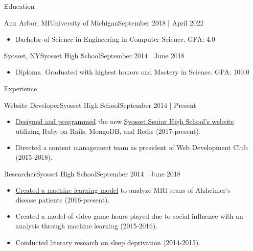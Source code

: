 \documentclass[]{mcdowellcv}
\begin{document}
    \makeheader
          

    \begin{cvsection}{Education}
        \begin{cvsubsection}{Ann Arbor, MI}{University of Michigan}{September 2018 | April 2022}
            \begin{itemize}
                \item 
                    Bachelor of Science in Engineering in Computer Science. 
                    \hfill {GPA: 4.0}
                    \vspace*{-4pt}
            \end{itemize}
        \end{cvsubsection}
        \begin{cvsubsection}{Syosset, NY}{Syosset High School}{September 2014 | June 2018}
            \begin{itemize}
                \item 
                    Diploma. Graduated with highest honors and Mastery in Science.
                    \hfill {GPA: 100.0}
                    \vspace*{-4pt}
            \end{itemize}
        \end{cvsubsection}
    \end{cvsection}
    \begin{cvsection}{Experience}
        \begin{cvsubsection}{Website Developer}{Syosset High School}{September 2014 | Present}
            \begin{itemize}%
                \item \href{https://github.com/Syosset/syosset/}{Designed and programmed} the new \href{https://syosseths.com/}{Syosset Senior High School’s website} utilizing Ruby on Rails, MongoDB, and Redis (2017-present).
                \item Directed a content management team as president of Web Development Club (2015-2018).
            \end{itemize}
        \end{cvsubsection}
        \begin{cvsubsection}{Researcher}{Syosset High School}{September 2014 | June 2018}
            \begin{itemize}%
                \item \href{https://drive.google.com/open?id=0BwjeQIrDl4kCRGJPZHNoZWRIVFE}{Created a machine learning model} to analyze MRI scans of Alzheimer’s disease patients (2016-present).
                \item Created a model of video game hours played due to social influence with an analysis through machine learning (2015-2016).
                \item Conducted literary research on sleep deprivation (2014-2015).
            \end{itemize}
        \end{cvsubsection}
    \end{cvsection}
\end{document}

